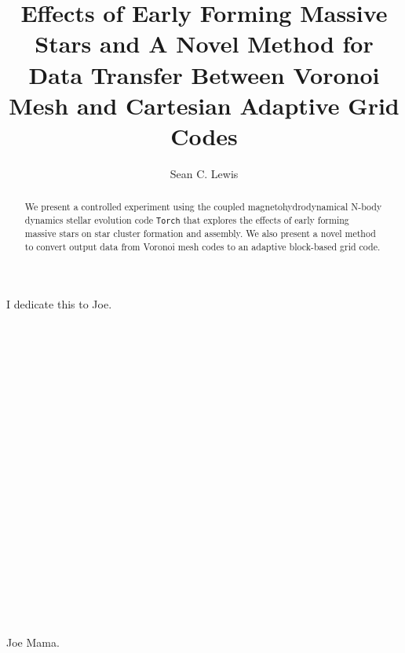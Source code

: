 \documentclass{drexel-thesis}
\author{Sean C. Lewis}    %
\title{Effects of Early Forming Massive Stars and A Novel Method for Data Transfer Between Voronoi Mesh and Cartesian Adaptive Grid Codes}     %
\begin{document}
\begin{preamble}

\begin{dedications} %
I dedicate this to Joe. \\ \\ \\ \\ \\ \\ \\ \\ \\ \\ \\ \\ \\ \\ \\ \\ \\ \\ \\ \\ \\ \\ Joe Mama.
\end{dedications}

\begin{acknowledgments} %
\end{acknowledgments}

\tableofcontents
\listoftables  %
\listoffigures %

\begin{abstract}
We present a controlled experiment using the coupled magnetohydrodynamical N-body dynamics stellar evolution code \texttt{Torch} that explores the effects of early forming massive stars on star cluster formation and assembly. We also present a novel method to convert output data from Voronoi mesh codes to an adaptive block-based grid code. 
\end{abstract}
\end{preamble}
\end{document}
